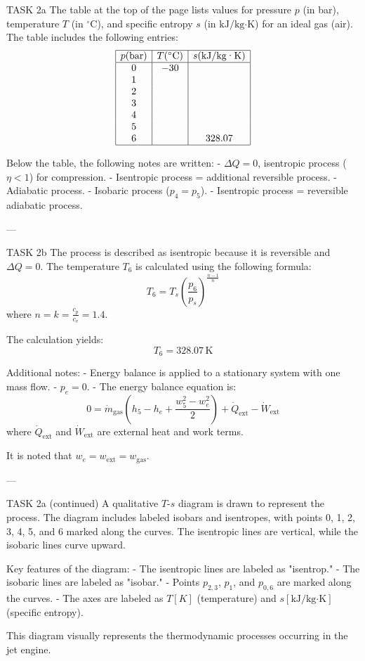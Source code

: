 TASK 2a  
The table at the top of the page lists values for pressure \( p \) (in bar), temperature \( T \) (in \( ^\circ \text{C} \)), and specific entropy \( s \) (in \( \text{kJ/kg·K} \)) for an ideal gas (air). The table includes the following entries:  
\[
\begin{array}{|c|c|c|}
\hline
p (\text{bar}) & T (^\circ \text{C}) & s (\text{kJ/kg·K}) \\
\hline
0 & -30 & \\
1 & & \\
2 & & \\
3 & & \\
4 & & \\
5 & & \\
6 & & 328.07 \\
\hline
\end{array}
\]

Below the table, the following notes are written:  
- \( \Delta Q = 0 \), isentropic process (\( \eta < 1 \)) for compression.  
- Isentropic process = additional reversible process.  
- Adiabatic process.  
- Isobaric process (\( p_4 = p_5 \)).  
- Isentropic process = reversible adiabatic process.  

---

TASK 2b  
The process is described as isentropic because it is reversible and \( \Delta Q = 0 \). The temperature \( T_6 \) is calculated using the following formula:  
\[
T_6 = T_s \left( \frac{p_6}{p_s} \right)^{\frac{n-1}{n}}
\]
where \( n = k = \frac{c_p}{c_v} = 1.4 \).  

The calculation yields:  
\[
T_6 = 328.07 \, \text{K}
\]

Additional notes:  
- Energy balance is applied to a stationary system with one mass flow.  
- \( p_e = 0 \).  
- The energy balance equation is:  
\[
0 = \dot{m}_{\text{gas}} \left( h_5 - h_e + \frac{w_5^2 - w_e^2}{2} \right) + \dot{Q}_{\text{ext}} - \dot{W}_{\text{ext}}
\]
where \( \dot{Q}_{\text{ext}} \) and \( \dot{W}_{\text{ext}} \) are external heat and work terms.  

It is noted that \( w_e = w_{\text{ext}} = w_{\text{gas}} \).

---

TASK 2a (continued)  
A qualitative \( T \)-\( s \) diagram is drawn to represent the process. The diagram includes labeled isobars and isentropes, with points 0, 1, 2, 3, 4, 5, and 6 marked along the curves. The isentropic lines are vertical, while the isobaric lines curve upward.  

Key features of the diagram:  
- The isentropic lines are labeled as "isentrop."  
- The isobaric lines are labeled as "isobar."  
- Points \( p_{2,3} \), \( p_1 \), and \( p_{0,6} \) are marked along the curves.  
- The axes are labeled as \( T [K] \) (temperature) and \( s [\text{kJ/kg·K}] \) (specific entropy).  

This diagram visually represents the thermodynamic processes occurring in the jet engine.